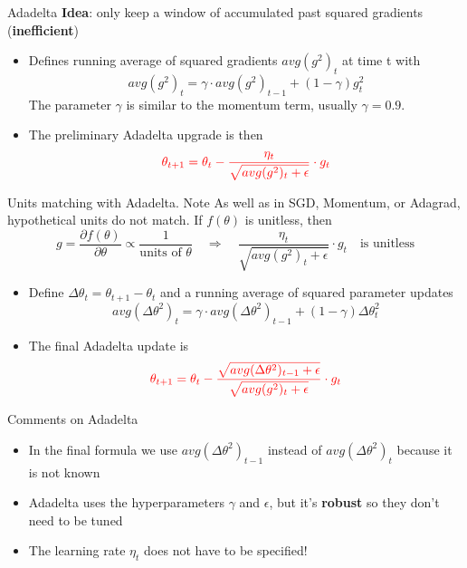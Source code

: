 \documentclass[english]{article}
\begin{document}

\item {Adadelta}
\textbf{Idea}: only keep a window of accumulated past squared gradients (\textbf{inefficient})

\begin{itemize}
\item Defines running average of squared gradients $avg(g^2)_t$ at time t with
$$avg(g^2)_t = \gamma \cdot avg(g^2)_{t-1} + (1-\gamma) g^2_t$$
The parameter $\gamma$ is similar to the momentum term, usually $\gamma = 0.9$.
\item The preliminary Adadelta upgrade is then
 $$\textcolor{red}{\theta_{t+1} = \theta_t - \frac{\eta_t}{\sqrt{avg(g^2)_t + \epsilon}} \cdot g_t}$$
\end{itemize}










\item {Units matching with Adadelta}. 
{Note}
As well as in SGD, Momentum, or Adagrad, hypothetical units do not match. If $f(\theta)$ is unitless, then 
$$g = \frac{\partial f(\theta)}{\partial \theta} \propto \frac{1}{\text{units of }\theta} \quad\Rightarrow\quad \frac{\eta_t}{\sqrt{avg(g^2)_t + \epsilon}} \cdot g_t \quad \text{is unitless}$$


\begin{itemize}
\item Define $\Delta\theta_t = \theta_{t+1} - \theta_t$ and a running average of squared parameter updates
$$avg(\Delta\theta^2)_t = \gamma \cdot avg(\Delta\theta^2)_{t-1} + (1-\gamma) \Delta\theta^2_t$$
\item The final Adadelta update is
$$\textcolor{red}{\theta_{t+1} = \theta_t - \frac{\sqrt{avg(\Delta\theta^2)_{t-1} + \epsilon}}{\sqrt{avg(g^2)_t + \epsilon}} \cdot g_t}$$
\end{itemize}










\item {Comments on Adadelta}

\begin{itemize}
\item In the final formula we use $avg(\Delta\theta^2)_{t-1}$ instead of $avg(\Delta\theta^2)_{t}$ because it is not known 
\item Adadelta uses the hyperparameters $\gamma$ and $\epsilon$, but it's \textbf{robust} so they don't need to be tuned 
\item The learning rate $\eta_t$ does not have to be specified!
\end{itemize}
\end{document}
